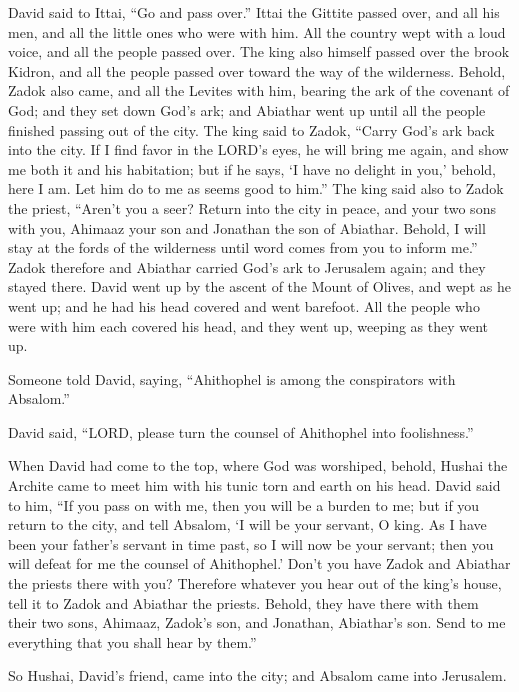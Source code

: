 \myverse{}David said to Ittai, “Go and pass over.” Ittai the Gittite passed
over, and all his men, and all the little ones who were with him.
\myverse{}All the country wept with a loud voice, and all the people passed over. The
king also himself passed over the brook Kidron, and all the people passed over toward the way of the wilderness.
\myverse{}Behold, Zadok also came, and all the Levites with him, bearing the ark of
the covenant of God; and they set down God’s ark; and Abiathar went up until all the people finished passing
out of the city.
\myverse{}The king said to Zadok, “Carry God’s ark back into the city. If I find favor
in the LORD’s eyes, he will bring me again, and show me both it and his habitation;
\myverse{}but if he says, ‘I have no delight in you,’ behold, here I am. Let him do
to me as seems good to him.”
\myverse{}The king said also to Zadok the priest, “Aren’t you a seer? Return into the
city in peace, and your two sons with you, Ahimaaz your son and Jonathan the son of Abiathar.
\myverse{}Behold, I will stay at the fords of the wilderness until word comes from
you to inform me.”
\myverse{}Zadok therefore and Abiathar carried God’s ark to Jerusalem again; and they
stayed there.
\myverse{}David went up by the ascent of the Mount of Olives, and wept as he went up;
and he had his head covered and went barefoot. All the people who were with him each covered his head,
and they went up, weeping as they went up.

\myverse{}Someone told David, saying, “Ahithophel is among the conspirators
with Absalom.”

David said, “LORD, please turn the counsel of Ahithophel into foolishness.”

\myverse{}When David had come to the top, where God was worshiped, behold,
Hushai the Archite came to meet him with his tunic torn and earth on his head.
\myverse{}David said to him, “If you pass on with me, then you will be a burden to
me;
\myverse{}but if you return to the city, and tell Absalom, ‘I will be your servant,
O king. As I have been your father’s servant in time past, so I will now be your servant; then you will
defeat for me the counsel of Ahithophel.’
\myverse{}Don’t you have Zadok and Abiathar the priests there with you? Therefore whatever
you hear out of the king’s house, tell it to Zadok and Abiathar the priests.
\myverse{}Behold, they have there with them their two sons, Ahimaaz, Zadok’s son, and
Jonathan, Abiathar’s son. Send to me everything that you shall hear by them.”

\myverse{}So Hushai, David’s friend, came into the city; and Absalom came
into Jerusalem.


